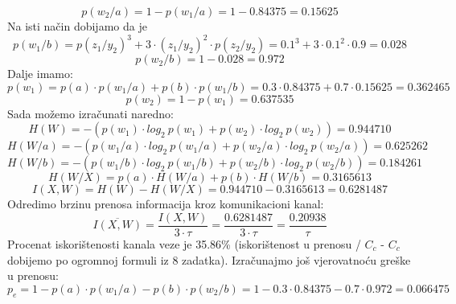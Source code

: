 \documentclass[12pt]{article}
\begin{document}
\begin{enumerate}
\begin{equation*}
\end{equation*}
\begin{equation*}
    p(w_2/a) = 1 - p(w_1/a) = 1 - 0.84375 = 0.15625
\end{equation*}
Na isti način dobijamo da je \\
\begin{equation*}
    p(w_1/b) = p(z_1/y_2)^3 + 3 \cdot (z_1/y_2)^2 \cdot p(z_2/y_2) = 0.1^3 + 3 \cdot 0.1^2 \cdot 0.9 = 0.028
\end{equation*}
\begin{equation*}
    p(w_2/b) = 1 - 0.028 = 0.972
\end{equation*}
Dalje imamo:
\begin{equation*}
    p(w_1) = p(a) \cdot p(w_1/a) + p(b) \cdot p(w_1/b) = 0.3 \cdot 0.84375 + 0.7 \cdot 0.15625 = 0.362465
\end{equation*}
\begin{equation*}
    p(w_2) = 1 - p(w_1) =  0.637535
\end{equation*}
Sada možemo izračunati naredno: \\
\begin{equation*}
    H(W) = -(p(w_1) \cdot log_2~p(w_1) + p(w_2) \cdot log_2~p(w_2)) = 0.944710
\end{equation*}
\begin{equation*}
    H(W/a) = -(p(w_1/a) \cdot log_2~p(w_1/a) + p(w_2/a) \cdot log_2~p(w_2/a)) = 0.625262
\end{equation*}
\begin{equation*}
    H(W/b) = -(p(w_1/b) \cdot log_2~p(w_1/b) + p(w_2/b) \cdot log_2~p(w_2/b)) = 0.184261
\end{equation*}
\begin{equation*}
    H(W/X) = p(a) \cdot H(W/a) + p(b) \cdot H(W/b) = 0.3165613
\end{equation*}
\begin{equation*} 
    I(X,W) = H(W) - H(W/X) = 0.944710 - 0.3165613 = 0.6281487
\end{equation*}
Odredimo brzinu prenosa informacija kroz komunikacioni kanal:
\begin{equation*}
        \overline{I(X,W)} = \frac{I(X,W)}{3 \cdot \tau} = \frac{0.6281487}{3 \cdot \tau} = \frac{0.20938}{\tau}
\end{equation*}
Procenat iskorištenosti kanala veze je 35.86\% (iskorištenost u prenosu / $C_c$ - $C_c$ dobijemo po ogromnoj formuli iz 8 zadatka). Izračunajmo još
vjerovatnoću greške u prenosu: 
\begin{equation*}
    p_e = 1 - p(a) \cdot p(w_1/a) - p(b) \cdot p(w_2/b) = 1 - 0.3 \cdot 0.84375 - 0.7 \cdot 0.972 = 0.066475
\end{equation*} 
	\end{enumerate}
    
\end{document}
